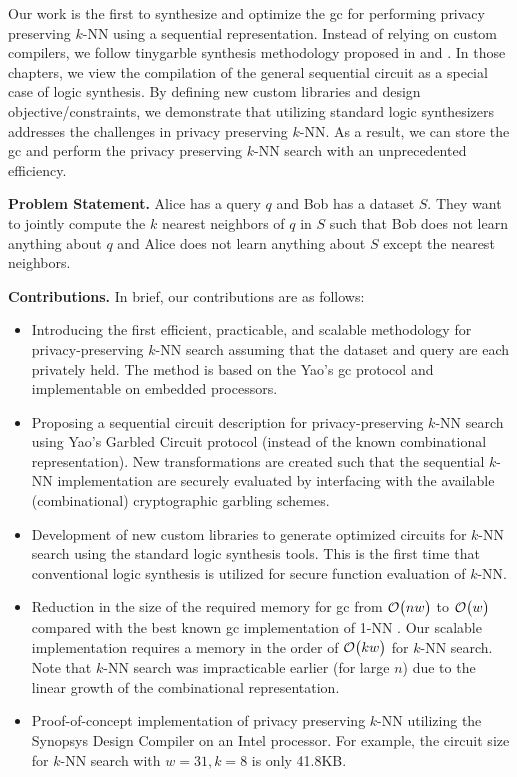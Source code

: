 Our work is the first to synthesize and optimize the \acrshort{gc} for performing privacy preserving $k$-NN using a sequential representation.
Instead of relying on custom compilers, we follow \gls{tinygarble} synthesis methodology proposed in  and .
In those chapters, we view the compilation of the general sequential circuit as a special case of logic synthesis.
By defining new custom libraries and design objective/constraints, we demonstrate that utilizing standard logic synthesizers addresses the challenges in privacy preserving $k$-NN.
As a result, we can store the \acrshort{gc} and perform the privacy preserving $k$-NN search with an unprecedented efficiency.

\textbf{Problem Statement.} Alice has a query $q$ and Bob has a dataset $S$.
They want to jointly compute the $k$ nearest neighbors of $q$ in $S$ such that Bob does not learn anything about $q$ and Alice does not learn anything about $S$ except the nearest neighbors.

\textbf{Contributions.} In brief, our contributions are as follows:

\begin{itemize}
  \item Introducing the first efficient, practicable, and scalable methodology for privacy-preserving $k$-NN search assuming that the dataset and query are each privately held.
  The method is based on the Yao's \acrshort{gc} protocol and implementable on embedded processors.

  \item Proposing a sequential circuit description for privacy-preserving $k$-NN search using Yao's Garbled Circuit protocol (instead of the known combinational representation).
  New transformations are created such that the sequential $k$-NN implementation are securely evaluated by interfacing with the available (combinational) cryptographic garbling schemes.

  \item Development of new custom libraries to generate optimized circuits for $k$-NN search using the standard logic synthesis tools.
  This is the first time that conventional logic synthesis is utilized for secure function evaluation of $k$-NN.

  \item Reduction in the size of the required memory for \acrshort{gc} from $\mathcal{O}\bigl(nw\bigr)$ to $\mathcal{O}\bigl(w\bigr)$ compared with the best known \acrshort{gc} implementation of 1-NN \cite{kolesnikov2009improved}.
  Our scalable implementation requires a memory in the order of $\mathcal{O}\bigl(kw\bigr)$ for $k$-NN search.
  Note that $k$-NN search was impracticable earlier (for large $n$) due to the linear growth of the combinational representation.

  \item Proof-of-concept implementation of privacy preserving $k$-NN utilizing the Synopsys Design Compiler on an Intel processor.
  For example, the circuit size for $k$-NN search with $w=31, k=8$ is only 41.8KB.
\end{itemize}

